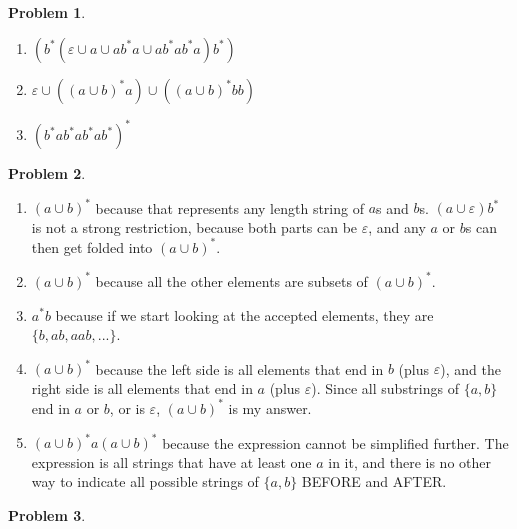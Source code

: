 \documentclass[11pt]{article}
\theoremstyle{definition}
\theoremstyle{case}
\theoremstyle{theorem}
\newtheorem{prob}{Problem}
\begin{document}
\begin{prob}\end{prob}

\begin{enumerate}[label=(\alph*)]

\item
$(b^*(\varepsilon \cup a \cup ab^*a \cup ab^*ab^*a)b^*)$

\item
$\varepsilon \cup ((a \cup b)^*a) \cup ((a \cup b)^*bb) $

\item
$(b^*ab^*ab^*ab^*)^*$

\end{enumerate}

\newpage

\begin{prob}\end{prob}

\begin{enumerate}[label=(\alph*)]

\item
$(a \cup b)^*$ because that represents any length string of $a$s and $b$s. $(a \cup \varepsilon)b^*$ is not
a strong restriction, because both parts can be $\varepsilon$, and any $a$ or $b$s can then get folded into
$(a \cup b)^*$.

\item
$(a \cup b)^*$ because all the other elements are subsets of $(a \cup b)^*$.

\item
$a^*b$ because if we start looking at the accepted elements, they are $\{b, ab, aab, ...\}$.

\item
$(a \cup b)^*$ because the left side is all elements that end in $b$ (plus $\varepsilon$), 
and the right side is all elements that end in $a$ (plus $\varepsilon$). Since all substrings of $\{a, b\}$ 
end in $a$ or $b$, or is $\varepsilon$, $(a \cup b)^*$ is my answer.

\item
$(a \cup b)^* a (a \cup b)^*$ because the expression cannot be simplified further. The expression
is all strings that have at least one $a$ in it, and there is no other way to indicate all 
possible strings of $\{a, b\}$ BEFORE and AFTER.  

\end{enumerate}

\begin{prob}\end{prob}
\end{document}
